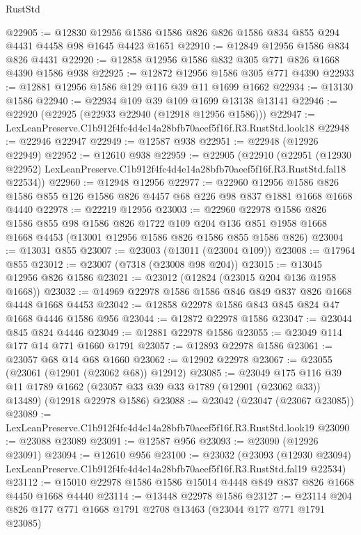 \begin{lexlean}{RustStd}
\begin{coremodule}
@22905 := @12830 @12956 @1586 @1586 @826 @826 @1586 @834 @855 @294 @4431 @4458 @98 @1645 @4423 @1651
@22910 := @12849 @12956 @1586 @834 @826 @4431
@22920 := @12858 @12956 @1586 @832 @305 @771 @826 @1668 @4390 @1586 @938
@22925 := @12872 @12956 @1586 @305 @771 @4390
@22933 := @12881 @12956 @1586 @129 @116 @39 @11 @1699 @1662
@22934 := @13130 @1586
@22940 := @22934 @109 @39 @109 @1699 @13138 @13141
@22946 := @22920 (@22925 (@22933 @22940 (@12918 @12956 @1586)))
@22947 := LexLeanPreserve.C1b912f4fc4d4e14a28bfb70aeef5f16f.R3.RustStd.look18
@22948 := @22946 @22947
@22949 := @12587 @938
@22951 := @22948 (@12926 @22949)
@22952 := @12610 @938
@22959 := @22905
    (@22910
      (@22951
        (@12930 @22952)
        LexLeanPreserve.C1b912f4fc4d4e14a28bfb70aeef5f16f.R3.RustStd.fal18
        @22534))
@22960 := @12948 @12956
@22977 := @22960
    @12956
    @1586
    @826
    @1586
    @855
    @126
    @1586
    @826
    @4457
    @68
    @226
    @98
    @837
    @1881
    @1668
    @1668
    @4440
@22978 := @22219 @12956
@23003 := @22960
    @22978
    @1586
    @826
    @1586
    @855
    @98
    @1586
    @826
    @1722
    @109
    @204
    @136
    @851
    @1958
    @1668
    @1668
    @4453
    (@13001 @12956 @1586 @826 @1586 @855 @1586 @826)
@23004 := @13031 @855
@23007 := @23003 (@13011 (@23004 @109))
@23008 := @17964 @855
@23012 := @23007 (@7318 (@23008 @98 @204))
@23015 := @13045 @12956 @826 @1586
@23021 := @23012 (@12824 (@23015 @204 @136 @1958 @1668))
@23032 := @14969 @22978 @1586 @1586 @846 @849 @837 @826 @1668 @4448 @1668 @4453
@23042 := @12858 @22978 @1586 @843 @845 @824 @47 @1668 @4446 @1586 @956
@23044 := @12872 @22978 @1586
@23047 := @23044 @845 @824 @4446
@23049 := @12881 @22978 @1586
@23055 := @23049 @114 @177 @14 @771 @1660 @1791
@23057 := @12893 @22978 @1586
@23061 := @23057 @68 @14 @68 @1660
@23062 := @12902 @22978
@23067 := @23055 (@23061 (@12901 (@23062 @68)) @12912)
@23085 := @23049
    @175
    @116
    @39
    @11
    @1789
    @1662
    (@23057 @33 @39 @33 @1789 (@12901 (@23062 @33)) @13489)
    (@12918 @22978 @1586)
@23088 := @23042 (@23047 (@23067 @23085))
@23089 := LexLeanPreserve.C1b912f4fc4d4e14a28bfb70aeef5f16f.R3.RustStd.look19
@23090 := @23088 @23089
@23091 := @12587 @956
@23093 := @23090 (@12926 @23091)
@23094 := @12610 @956
@23100 := @23032
    (@23093
      (@12930 @23094)
      LexLeanPreserve.C1b912f4fc4d4e14a28bfb70aeef5f16f.R3.RustStd.fal19
      @22534)
@23112 := @15010 @22978 @1586 @1586 @15014 @4448 @849 @837 @826 @1668 @4450 @1668 @4440
@23114 := @13448 @22978 @1586
@23127 := @23114 @204 @826 @177 @771 @1668 @1791 @2708 @13463 (@23044 @177 @771 @1791 @23085)

\end{coremodule}
\end{lexlean}
